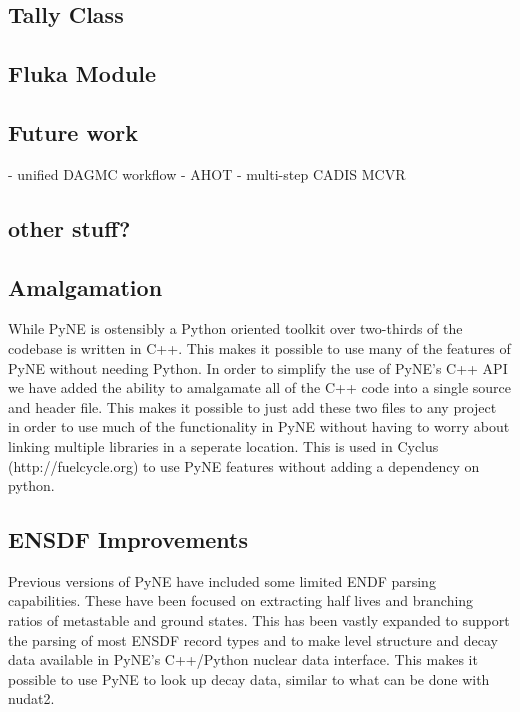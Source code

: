\documentclass{anstrans}
\begin{document}

\subsection{Tally Class}

\subsection{Fluka Module}

\subsection{Future work}
- unified DAGMC workflow
- AHOT
- multi-step CADIS MCVR

\subsection{other stuff?}

\subsection{Amalgamation}

While PyNE is ostensibly a Python oriented toolkit over two-thirds of the codebase is written in C++. This makes it possible to use many of the features of PyNE without needing Python. In order to simplify the use of PyNE's C++ API we have added the ability to amalgamate all of the C++ code into a single source and header file. This makes it possible to just add these two files to any project in order to use much of the functionality in PyNE without having to worry about linking multiple libraries in a seperate location. This is used in Cyclus (http://fuelcycle.org) to use PyNE features without adding a dependency on python.

\subsection{ENSDF Improvements}

Previous versions of PyNE have included some limited ENDF parsing capabilities. These have been focused on extracting half lives and branching ratios of metastable and ground states. This has been vastly expanded to support the parsing of most ENSDF record types and to make level structure and decay data available in PyNE's C++/Python nuclear data interface. This makes it possible to use PyNE to look up decay data, similar to what can be done with nudat2. 
\end{document}
